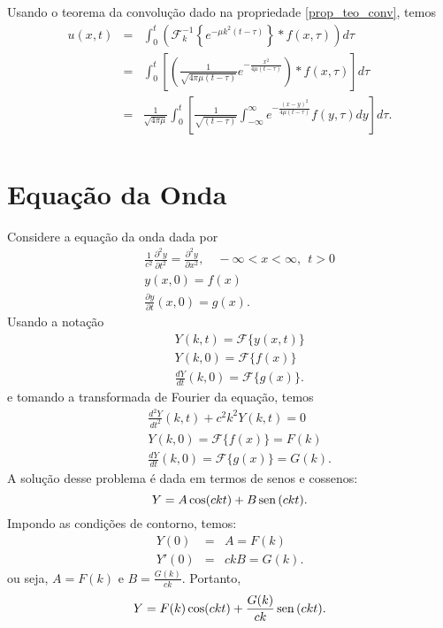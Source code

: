 Usando o teorema da convolução dado na propriedade \ref{prop_teo_conv}, temos
\begin{eqnarray*}
u(x,t)&=&\int_0^t \left(\mathcal{F}_k^{-1}\left\{
e^{-\mu k^2 (t-\tau)}\right\}\ast f(x,\tau)\right)d\tau\\
&=&\int_0^t \left[\left(\frac{1}{\sqrt{4\pi\mu (t-\tau)}} e^{-\frac{x^2}{4\mu (t-\tau)}}\right) \ast f(x,\tau)\right]d\tau\\
&=&\frac{1}{\sqrt{4\pi\mu}}\int_0^t \left[\frac{1}{\sqrt{ (t-\tau)}} \int_{-\infty}^\infty e^{-\frac{(x-y)^2}{4\mu (t-\tau)}}f(y,\tau)dy\right]d\tau.\\
\end{eqnarray*}
\section{Equação da Onda}
Considere a equação da onda dada por
\begin{eqnarray*}
&&\frac{1}{c^2}\frac{\partial^2 y}{\partial t^2}=\frac{\partial^2
y}{\partial x^2},\quad -\infty<x<\infty,\ \ t>0\\
&&y(x,0)=f(x)\\
&&\frac{\partial y}{\partial t}(x,0)=g(x).
\end{eqnarray*}
Usando a notação
\begin{eqnarray*}
&&Y(k,t)=\mathcal{F} \{y(x,t)\}\\
&&Y(k,0)=\mathcal{F}\{f(x)\}\\
&&\frac{d Y}{d t}(k,0)=\mathcal{F}\{g(x)\}.
\end{eqnarray*}
e tomando a transformada de Fourier da equação, temos
\begin{eqnarray*}
&&\frac{d^2 Y}{d
t^2}(k,t)+c^2k^2Y(k,t)=0\\
&&Y(k,0)=\mathcal{F}\{f(x)\}=F(k)\\
&&\frac{d Y}{d t}(k,0)=\mathcal{F}\{g(x)\}=G(k).
\end{eqnarray*}
A solução desse problema é dada em termos de senos e cossenos:
\begin{equation}
Y=A\cos(ckt)+B\operatorname{sen}\,(ckt).
\end{equation}
Impondo as condições de contorno, temos:
\begin{eqnarray*}
Y(0)&=&A=F(k)\\
Y'(0)&=&ckB=G(k).
\end{eqnarray*}
ou seja, $A=F(k)$ e $B=\frac{G(k)}{ck}$. Portanto,
\begin{equation*}
Y=F(k)\cos(ckt)+\frac{G(k)}{ck}\operatorname{sen}\,(ckt).
\end{equation*}
